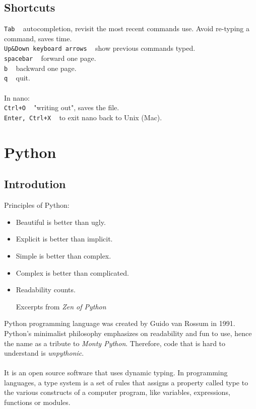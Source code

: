 \documentclass{article}
\begin{document}
{\subsection{\textbf{Shortcuts}}
\texttt{Tab}	 ~	autocompletion, revisit the most recent commands use. Avoid re-typing a command, saves time.\\
\texttt{Up\&Down keyboard arrows} ~ show previous commands typed.\\
\texttt{spacebar} ~	forward one page.\\
\texttt{b} ~	 backward one page.\\
\texttt{q} ~	 quit.\\
\\
In nano:\\
\indent
\texttt{Ctrl+O} ~ "writing out", saves the file. \\
\indent
\texttt{Enter, Ctrl+X} ~ to exit nano back to Unix (Mac).\\

\newpage
\section{Python}
\subsection{Introdution}

Principles of Python:
\begin{itemize}
\item[]Beautiful is better than ugly.
\item[]Explicit is better than implicit.
\item[]Simple is better than complex.
\item[]Complex is better than complicated.
\item[]Readability counts.

\hfill Excerpts from \textit{Zen of Python} 
\end{itemize}

Python programming language was created by Guido van Rossum in 1991. Python's minimalist philosophy emphasizes on readability and fun to use, hence the name as a tribute to \textit{Monty Python}. Therefore, code that is hard to understand is \textit{unpythonic}.\\
\\
 It is an open source software that uses dynamic typing. In programming languages, a type system is a set of rules that assigns a property called type to the various constructs of a computer program, like variables, expressions, functions or modules. 
}
\end{document}
